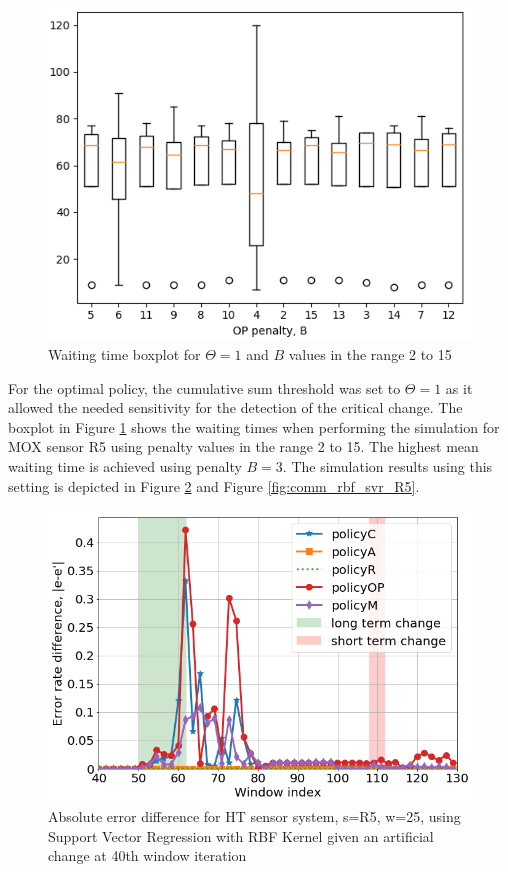 \documentclass{mpaper}
\begin{document}
\begin{figure}[h]
    \centering
    \includegraphics[scale=0.4]{imgs/boxplot_svr_waiting_R5.png}
    \caption{Waiting time boxplot for $\Theta=1$ and $B$ values in the range 2 to 15}
    \label{fig:boxplot_svr}
\end{figure}

For the optimal policy, the cumulative sum threshold was set to $\Theta=1$ as it allowed the needed sensitivity for the detection of the critical change. The boxplot in Figure \ref{fig:boxplot_svr} shows the waiting times when performing the simulation for MOX sensor R5 using penalty values in the range 2 to 15. The highest mean waiting time is achieved using penalty $B=3$. The simulation results using this setting is depicted in Figure \ref{fig:err_rbf_svr_R5} and Figure \ref{fig:comm_rbf_svr_R5}.

\begin{figure}[h]
    \centering
    \includegraphics[scale=0.33]{imgs/svr_rbf_R5_w25.png}
    \caption{Absolute error difference for HT sensor system, s=R5, w=25,
    using Support Vector Regression with RBF Kernel 
    given an artificial change at 40th window iteration}
    \label{fig:err_rbf_svr_R5}
\end{figure}
\end{document}
